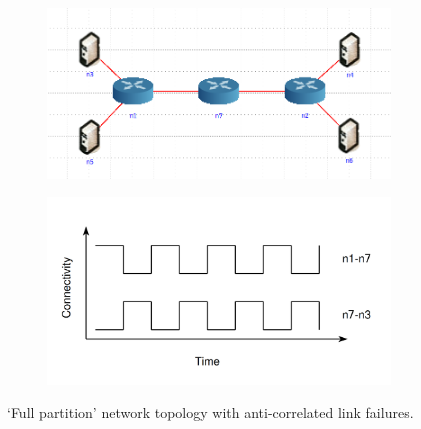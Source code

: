 \documentclass[10pt,twoside,a4paper]{article}
\begin{document}
\begin{figure}[H]
\centering
\begin{subfigure}{.5\textwidth}
  \centering
  \includegraphics[width=1\linewidth]{delay_full_partition_topology}
  \label{fig:full_partition_topology}
\end{subfigure}%
\begin{subfigure}{.5\textwidth}
  \centering
  \includegraphics[width=1\linewidth]{delay_full_partition_graph}
  \label{fig:full_partition_graph}
\end{subfigure}
\caption{`Full partition' network topology with anti-correlated link failures.}
\label{fig:full_partition}
\end{figure}
\end{document}

